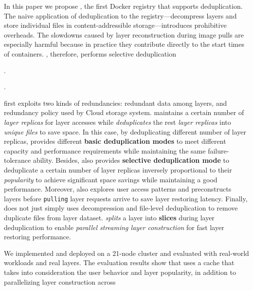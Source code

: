 
In this paper we propose \emph{\sysname}, the first Docker registry that
supports deduplication.
%
The naive application of deduplication to the registry---decompress layers and
store individual files in content-addressible storage---introduces prohibitive
overheads.
%
The slowdowns caused by layer reconstruction during image pulls are especially
harmful because in practice they contribute directly to the start times of
containers.
%
\sysname, therefore, performs selective deduplication 

.


%
.

\sysname first exploits two kinds of redundancies: redundant data among layers,
and redundancy policy used by Cloud storage system.
%
\sysname maintains a certain number of \emph{layer replicas} for layer accesses
while \emph{deduplicates} the rest \emph{layer replicas} into \emph{unique
files} to save space.
%
In this case, by deduplicating different number of layer replicas, \sysname
provides different \textbf{basic deduplication modes} to meet different
capacity and performance requirements while maintaining the same
failure-tolerance ability.
%
Besides, \sysname also provides \textbf{selective deduplication mode} to
deduplicate a certain number of layer replicas inversely proportional to their
\emph{popularity} to achieve significant space savings while maintaining a good
performance.
%
Moreover, \sysname also explores user access patterns and preconstructs layers
before \texttt{pulling} layer requests arrive to save layer restoring latency.
%
Finally, \sysname does not just simply uses decompression and file-level
deduplication to remove duplicate files from layer dataset.
%
\sysname \emph{splits} a layer into \textbf{slices} during layer deduplication
to enable \emph{parallel streaming layer construction} for fast layer restoring
performance.



We implemented and deployed \sysname on a 21-node cluster and evaluated with
real-world workloads and real layers.
%
The evaluation results show that uses a cache that takes into consideration the
user behavior and layer popularity, in addition to parallelizing layer
construction across %

